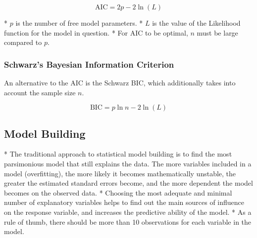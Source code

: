 
\[\mbox{AIC} = 2p - 2\ln(L)\]


*  $p$ is the number of free model parameters.
*  $L$ is the value of the Likelihood function for the model in question.
*  For AIC to be optimal, $n$ must be large compared to $p$.\\

\subsubsection*{Schwarz's Bayesian Information Criterion}
An alternative to the AIC is the Schwarz BIC, which additionally takes into account the sample size $n$.

\[\mbox{BIC} = p\ln{n} - 2\ln(L)\]



%
%
%
%
%
%




\subsection*{Model Building}

*  The traditional approach to statistical model building is to find the most parsimonious model that still explains the data. The more variables included in a model (overfitting), the more likely it becomes mathematically unstable, the greater the estimated standard errors become, and the more dependent the model becomes on the observed data. *  Choosing the most adequate and minimal number of explanatory variables helps to find out the main sources of influence on the response variable, and increases the predictive ability of the model. 
*  As a rule of thumb, there should be more than 10 observations for each variable in the model.



